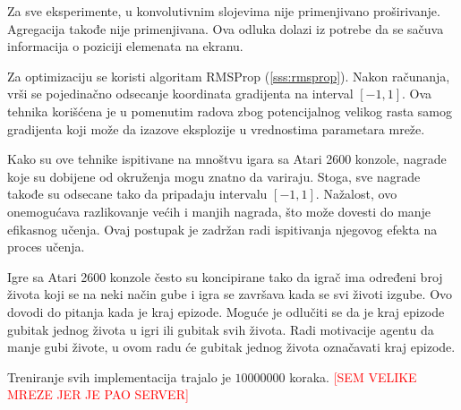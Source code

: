 \par 
Za sve eksperimente, u konvolutivnim slojevima nije primenjivano proširivanje. Agregacija takođe nije primenjivana. Ova odluka dolazi iz potrebe da se sačuva informacija o poziciji elemenata na ekranu.
\par 
Za optimizaciju se koristi algoritam RMSProp (\ref{sss:rmsprop}). Nakon računanja, vrši se pojedinačno odsecanje koordinata gradijenta na interval $[-1, 1]$. Ova tehnika korišćena je u pomenutim radova zbog potencijalnog velikog rasta samog gradijenta koji može da izazove eksplozije u vrednostima parametara mreže.
\par 
Kako su ove tehnike ispitivane na mnoštvu igara sa Atari 2600 konzole, nagrade koje su dobijene od okruženja mogu znatno da variraju. Stoga, sve nagrade takođe su odsecane tako da pripadaju intervalu $[-1, 1]$. Nažalost, ovo onemogućava razlikovanje većih i manjih nagrada, što može dovesti do manje efikasnog učenja. Ovaj postupak je zadržan radi ispitivanja njegovog efekta na proces učenja.
\par 
Igre sa Atari 2600 konzole često su koncipirane tako da igrač ima određeni broj života koji se na neki način gube i igra se završava kada se svi životi izgube. Ovo dovodi do pitanja kada je kraj epizode. Moguće je odlučiti se da je kraj epizode gubitak jednog života u igri ili gubitak svih života. Radi motivacije agentu da manje gubi živote, u ovom radu će gubitak jednog života označavati kraj epizode.
\par 
Treniranje svih implementacija trajalo je $10000000$ koraka. \textcolor{red}{[SEM VELIKE MREZE JER JE PAO SERVER]}
